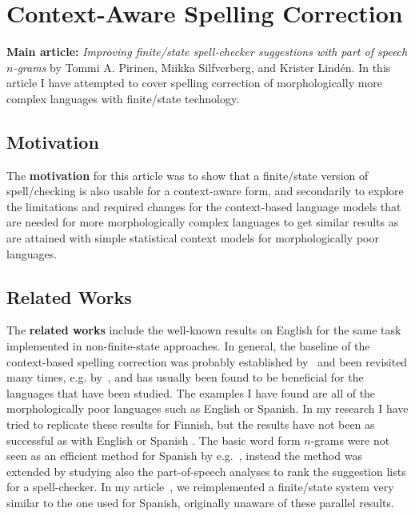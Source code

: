 \documentclass[officiallayout,final]{unihelcompling}
\begin{document}
\section{Context-Aware Spelling Correction}
\label{sec:context}

\textbf{Main article:} \emph{Improving finite\-/state spell-checker suggestions
with part of speech \(n\)-grams} by Tommi A. Pirinen, Miikka Silfverberg, and
Krister Lindén. In this article I have attempted to cover spelling
correction of morphologically more complex languages with finite\-/state
technology.

\subsection{Motivation}

The \textbf{motivation} for this article was to show that a finite\-/state
version of spell\-/checking is also usable for a context-aware form, and
secondarily to explore the limitations and required changes for the
context-based language models that are needed for more morphologically complex
languages to get similar results as are attained with simple statistical
context models for morphologically poor languages.

\subsection{Related Works}

The \textbf{related works} include the well-known results on English for the
same task implemented in non-finite-state approaches.  In general, the baseline
of the context-based spelling correction was probably established
by~\citet{mays1991context} and been revisited many times, e.g.
by~\citet{wilcox-ohearn2008realword}, and has usually been found to be
beneficial for the languages that have been studied. The examples I have found
are all of the morphologically poor languages such as English or Spanish. In my
research I have tried to replicate these results for Finnish, but the results
have not been as successful as with English or Spanish .  The basic word form
\(n\)-grams were not seen as an efficient method for Spanish by
e.g.~\citet{otero2007contextual}, instead the method was extended by studying
also the part-of-speech analyses to rank the suggestion lists for a
spell-checker. In my article~, we
reimplemented a finite\-/state system very similar to the one used for Spanish,
originally unaware of these parallel results.
\end{document}
